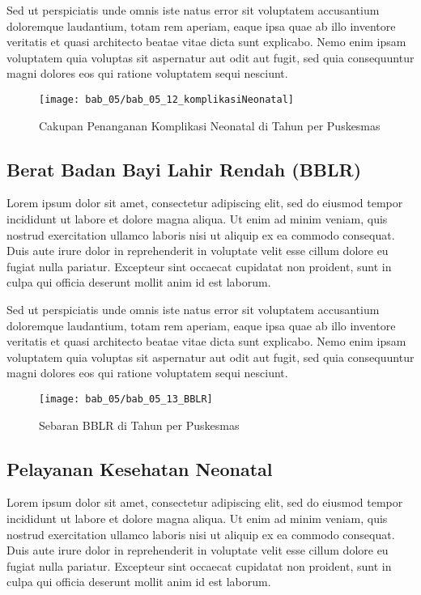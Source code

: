 Sed ut perspiciatis unde omnis iste natus error sit voluptatem accusantium doloremque laudantium, totam rem aperiam, eaque ipsa quae ab illo inventore veritatis et quasi architecto beatae vitae dicta sunt explicabo. Nemo enim ipsam voluptatem quia voluptas sit aspernatur aut odit aut fugit, sed quia consequuntur magni dolores eos qui ratione voluptatem sequi nesciunt.

\begin{figure}[H]
    \centering
    \texttt{[image: bab\_05/bab\_05\_12\_komplikasiNeonatal]}
    \caption{Cakupan Penanganan Komplikasi Neonatal di \namaKabupaten Tahun \tP per Puskesmas}
    \label{fig:Pelayanan-Komplikasi-Neonatal}
\end{figure}


\subsection{Berat Badan Bayi Lahir Rendah (BBLR)}
Lorem ipsum dolor sit amet, consectetur adipiscing elit, sed do eiusmod tempor incididunt ut labore et dolore magna aliqua. Ut enim ad minim veniam, quis nostrud exercitation ullamco laboris nisi ut aliquip ex ea commodo consequat. Duis aute irure dolor in reprehenderit in voluptate velit esse cillum dolore eu fugiat nulla pariatur. Excepteur sint occaecat cupidatat non proident, sunt in culpa qui officia deserunt mollit anim id est laborum.

Sed ut perspiciatis unde omnis iste natus error sit voluptatem accusantium doloremque laudantium, totam rem aperiam, eaque ipsa quae ab illo inventore veritatis et quasi architecto beatae vitae dicta sunt explicabo. Nemo enim ipsam voluptatem quia voluptas sit aspernatur aut odit aut fugit, sed quia consequuntur magni dolores eos qui ratione voluptatem sequi nesciunt.

\begin{figure}[H]
  \centering
  \texttt{[image: bab\_05/bab\_05\_13\_BBLR]}
  \caption{Sebaran BBLR di \namaKabupaten Tahun \tP per Puskesmas}
  \label{fig:Distribusi-BBLR}
\end{figure}

\subsection{Pelayanan Kesehatan Neonatal}
Lorem ipsum dolor sit amet, consectetur adipiscing elit, sed do eiusmod tempor incididunt ut labore et dolore magna aliqua. Ut enim ad minim veniam, quis nostrud exercitation ullamco laboris nisi ut aliquip ex ea commodo consequat. Duis aute irure dolor in reprehenderit in voluptate velit esse cillum dolore eu fugiat nulla pariatur. Excepteur sint occaecat cupidatat non proident, sunt in culpa qui officia deserunt mollit anim id est laborum.


